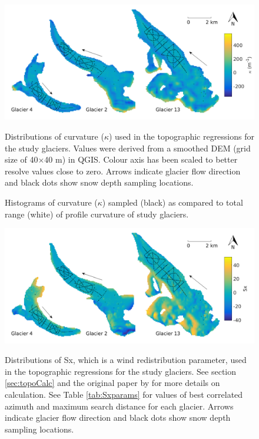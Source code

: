 \documentclass{sfuthesis}
\newcommand{\topomap}{Arrows indicate glacier flow direction and black dots show snow depth sampling locations. }
\begin{document}
\begin{figure}[H]
	\centering
	\includegraphics[width=\textwidth]{Map_curvature.png}\\
	\caption{Distributions of curvature ($\kappa$) used in the topographic regressions for the study glaciers. Values were derived from a smoothed DEM (grid size of 40$\times$40 m) in QGIS. Colour axis has been scaled to better resolve values close to zero. \topomap}
	\label{map:curvature}
\end{figure}

\begin{figure}[H]
	\caption{Histograms of curvature ($\kappa$) sampled (black) as compared to total range (white) of profile curvature of study glaciers.}
	\label{sampledRange:curvature}
\end{figure}

\begin{figure}[H]
	\centering
	\includegraphics[width=\textwidth]{Map_Sx.png}\\
	\caption{Distributions of Sx, which is a wind redistribution parameter, used in the topographic regressions for the study glaciers. See section \ref{sec:topoCalc} and the original paper by \cite{Winstral2002} for more details on calculation. See Table \ref{tab:Sxparams} for values of best correlated azimuth and maximum search distance for each glacier. \topomap }
	\label{map:Sx}
\end{figure}
\end{document}
